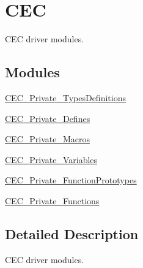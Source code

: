 \hypertarget{group___c_e_c}{\section{C\-E\-C}
\label{group___c_e_c}
}


C\-E\-C driver modules.  


\subsection*{Modules}
\begin{DoxyCompactItemize}
\item 
\hyperlink{group___c_e_c___private___types_definitions}{C\-E\-C\-\_\-\-Private\-\_\-\-Types\-Definitions}
\item 
\hyperlink{group___c_e_c___private___defines}{C\-E\-C\-\_\-\-Private\-\_\-\-Defines}
\item 
\hyperlink{group___c_e_c___private___macros}{C\-E\-C\-\_\-\-Private\-\_\-\-Macros}
\item 
\hyperlink{group___c_e_c___private___variables}{C\-E\-C\-\_\-\-Private\-\_\-\-Variables}
\item 
\hyperlink{group___c_e_c___private___function_prototypes}{C\-E\-C\-\_\-\-Private\-\_\-\-Function\-Prototypes}
\item 
\hyperlink{group___c_e_c___private___functions}{C\-E\-C\-\_\-\-Private\-\_\-\-Functions}
\end{DoxyCompactItemize}


\subsection{Detailed Description}
C\-E\-C driver modules. 